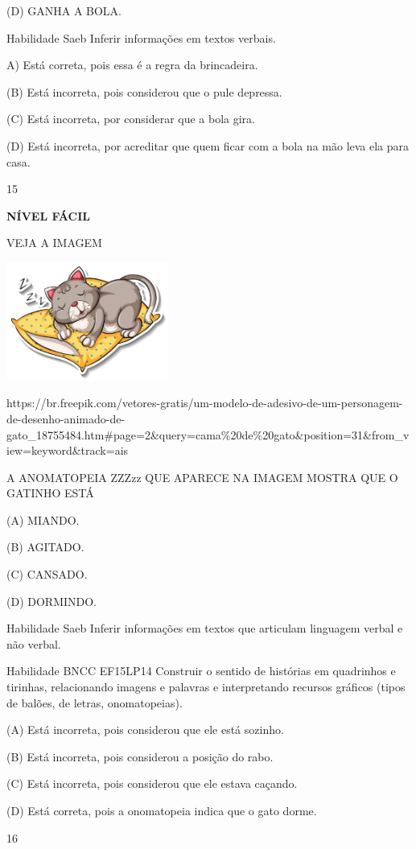 {{(D) GANHA A BOLA.

Habilidade Saeb Inferir informações em textos verbais.

A) Está correta, pois essa é a regra da brincadeira.

(B) Está incorreta, pois considerou que o pule depressa.

(C) Está incorreta, por considerar que a bola gira.

(D) Está incorreta, por acreditar que quem ficar com a bola na mão leva
ela para casa.

\num{15}

\textbf{NÍVEL FÁCIL}

VEJA A IMAGEM

\includegraphics[width=2.09091in,height=1.52916in]{media/image161.jpeg}

https://br.freepik.com/vetores-gratis/um-modelo-de-adesivo-de-um-personagem-de-desenho-animado-de-gato\_18755484.htm\#page=2\&query=cama\%20de\%20gato\&position=31\&from\_view=keyword\&track=ais

A ANOMATOPEIA ZZZzz QUE APARECE NA IMAGEM MOSTRA QUE O GATINHO ESTÁ

(A) MIANDO.

(B) AGITADO.

(C) CANSADO.

(D) DORMINDO.

Habilidade Saeb Inferir informações em textos que articulam linguagem
verbal e não verbal.

Habilidade BNCC EF15LP14 Construir o sentido de histórias em quadrinhos
e tirinhas, relacionando imagens e palavras e interpretando recursos
gráficos (tipos de balões, de letras, onomatopeias).

(A) Está incorreta, pois considerou que ele está sozinho.

(B) Está incorreta, pois considerou a posição do rabo.

(C) Está incorreta, pois considerou que ele estava caçando.

(D) Está correta, pois a onomatopeia indica que o gato dorme.

\num{16}

}}
